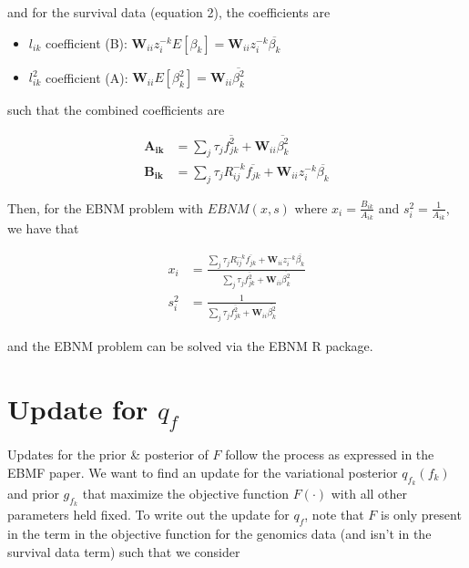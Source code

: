 \documentclass{article}[12pt]
\begin{document}
and for the survival data (equation 2), the coefficients are

\begin{itemize}
    \item $l_{ik}$ coefficient (B): $\mathbf{W}_{ii}z^{-k}_{i}E\left[\beta_{k}\right] = \mathbf{W}_{ii}z^{-k}_{i}\overline{\beta_{k}}$

    \item $l_{ik}^{2}$ coefficient (A): $\mathbf{W}_{ii}E\left[\beta^{2}_{k}\right] = \mathbf{W}_{ii}\overline{\beta^{2}_{k}}$
\end{itemize}

such that the combined coefficients are

\begin{align}
    \mathbf{A_{ik}} &= \sum_{j}\tau_{j}\overline{f^{2}_{jk}} + \mathbf{W}_{ii}\overline{\beta^{2}_{k}}\label{eq:A-L}\\
    \mathbf{B_{ik}} &= \sum_{j}\tau_{j}R^{-k}_{ij}\overline{f_{jk}} + \mathbf{W}_{ii}z^{-k}_{i}\overline{\beta_{k}}\label{eq:B-L}
\end{align}

Then, for the EBNM problem with $EBNM(x,s)$ where $x_i = \frac{B_{ik}}{A_{ik}}$ and $s^{2}_{i} = \frac{1}{A_{ik}}$, we have that

\begin{align}
    x_i &= \frac{\sum_{j}\tau_{j}R^{-k}_{ij}\overline{f_{jk}} + \mathbf{W}_{ii}z^{-k}_{i}\overline{\beta_{k}}}{\sum_{j}\tau_{j}\overline{f^{2}_{jk}} + \mathbf{W}_{ii}\overline{\beta^{2}_{k}}}\label{eq:xi-L}\\
    s^{2}_{i} &= \frac{1}{\sum_{j}\tau_{j}\overline{f^{2}_{jk}} + \mathbf{W}_{ii}\overline{\beta^{2}_{k}}}\label{eq:si-L}
\end{align}

and the EBNM problem can be solved via the EBNM R package.
\section{Update for $q_{f}$}

Updates for the prior \& posterior of $F$ follow the process as expressed in the EBMF paper. We want to find an update for the variational posterior $q_{f_k}(f_k)$ and prior $g_{f_k}$ that maximize the objective function $F(\cdot)$ with all other parameters held fixed. To write out the update for $q_f$, note that $F$ is only present in the term in the objective function for the genomics data (and isn't in the survival data term) such that we consider
\end{document}
